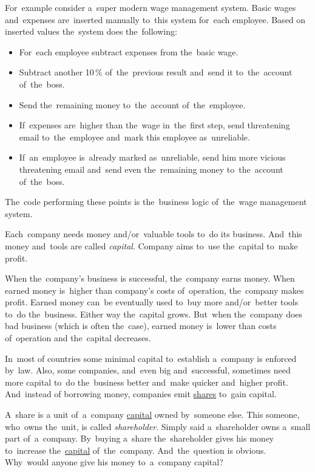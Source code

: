 For~example consider a~super modern wage management system.
Basic wages and~expenses are~inserted manually to~this system for~each employee.
Based on inserted values the~system does the~following:
\begin{itemize}
    \item For~each employee subtract expenses from the~basic wage.
    \item Subtract another 10\,\% of~the~previous result and~send it to~the~account of~the~boss.
    \item Send the~remaining money to~the~account of~the~employee.
    \item If~expenses are~higher than the~wage in~the~first step, send threatening email to~the~employee and~mark this employee as~unreliable.
    \item If~an~employee is~already marked as~unreliable, send him more vicious threatening email and~send even the~remaining money to~the~account of~the~boss.
\end{itemize}
\noindent The~code performing these points is the~business logic of~the~wage management \mbox{system}.

\label{capital}
Each~company needs money and/or~valuable tools to~do its business.
And~this money and~tools are called \textit{capital}.
Company aims to~use the~capital to~make profit.

When the~company's business is successful, the~company earns money.
When earned money is~higher than company's costs of~operation, the~company makes profit.
Earned money can~be eventually used to~buy more and/or~better tools to~do the~business.
Either way the~capital grows.
But~when the~company does bad business (which is often the~case), earned money is~lower than costs of~operation and the~capital decreases.

In~most of countries some minimal capital to~establish a~company is enforced by~law.
Also, some companies, and~even big and~successful, sometimes need more capital to~do the~business better and~make quicker and~higher profit.
And~instead of borrowing money, companies emit \hyperref[shares]{shares} to~gain capital.
\newpage

\label{share}
A~share is a unit of~a~company \hyperref[capital]{capital} owned by~someone else.
This someone, who~owns the~unit, is called \textit{shareholder}.
Simply said a~shareholder owns a~small part of~a~company.
By~buying a~share the~shareholder gives his money to~increase the~\hyperref[capital]{capital} of~the~company.
And~the~question is obvious.
Why~would anyone give his money to~a~company capital?

